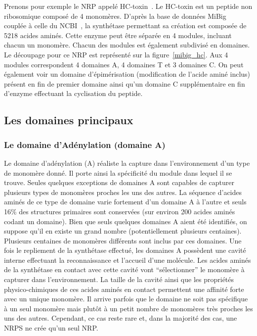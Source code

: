 Prenons pour exemple le NRP appelé HC-toxin~\cite{_mibig:_????}.
Le HC-toxin est un peptide non ribosomique composé de 4 monomères.
D'après la base de données MiBig~\cite{medema_minimum_2015} couplée à celle du NCBI~\cite{ncbi_resource_coordinators_database_2013}, la synthétase permettant sa création est composée de 5218 acides aminés.
Cette enzyme peut être séparée en 4 modules, incluant chacun un monomère.
Chacun des modules est également subdivisé en domaines.
Le découpage pour ce NRP est représenté sur la figure~\ref{mibig_hc}.
Aux 4 modules correspondent 4 domaines A, 4 domaines T et 3 domaines C.
On peut également voir un domaine d'épimérisation (modification de l'acide aminé inclus) présent en fin de premier domaine ainsi qu'un domaine C supplémentaire en fin d'enzyme effectuant la cyclisation du peptide.

\subsection{Les domaines principaux}

\subsubsection{Le domaine d'Adénylation (domaine A)}

Le domaine d'adénylation (A) réaliste la capture dans l'environnement d'un type de monomère donné.
Il porte ainsi la spécificité du module dans lequel il se trouve.
Seules quelques exceptions de domaines A sont capables de capturer plusieurs types de monomères proches les uns des autres.
La séquence d'acides aminés de ce type de domaine varie fortement d'un domaine A à l'autre et seuls 16\% des structures primaires sont conservées (sur environ 200 acides aminés codant un domaine).
Bien que seuls quelques domaines A aient été identifiés, on suppose qu'il en existe un grand nombre (potentiellement plusieurs centaines).
Plusieurs centaines de monomères différents sont inclus par ces domaines.
Une fois le repliement de la synthétase effectué, les domaines A possèdent une cavité interne effectuant la reconnaissance et l'accueil d'une molécule.
Les acides aminés de la synthétase en contact avec cette cavité vont ``sélectionner'' le monomère à capturer dans l'environnement.
La taille de la cavité ainsi que les propriétés physico-chimiques de ces acides aminés en contact permettent une affinité forte avec un unique monomère.
Il arrive parfois que le domaine ne soit pas spécifique à un seul monomère mais plutôt à un petit nombre de monomères très proches les uns des autres.
Cependant, ce cas reste rare et, dans la majorité des cas, une NRPS ne crée qu'un seul NRP.

